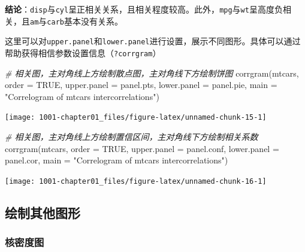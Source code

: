 \documentclass[
]{book}
\newenvironment{Shaded}{\begin{snugshade}}{\end{snugshade}}
\newcommand{\AttributeTok}[1]{\textcolor[rgb]{0.77,0.63,0.00}{#1}}
\newcommand{\CommentTok}[1]{\textcolor[rgb]{0.56,0.35,0.01}{\textit{#1}}}
\newcommand{\ConstantTok}[1]{\textcolor[rgb]{0.00,0.00,0.00}{#1}}
\newcommand{\FunctionTok}[1]{\textcolor[rgb]{0.00,0.00,0.00}{#1}}
\newcommand{\NormalTok}[1]{#1}
\newcommand{\StringTok}[1]{\textcolor[rgb]{0.31,0.60,0.02}{#1}}
\begin{document}
\textbf{结论}：\texttt{disp}与\texttt{cyl}呈正相关关系，且相关程度较高。此外，\texttt{mpg}与\texttt{wt}呈高度负相关，且\texttt{am}与\texttt{carb}基本没有关系。

这里可以对\texttt{upper.panel}和\texttt{lower.panel}进行设置，展示不同图形。具体可以通过帮助获得相信参数设置信息（\texttt{?corrgram}）

\begin{Shaded}
\begin{Highlighting}[]
\CommentTok{\# 相关图，主对角线上方绘制散点图，主对角线下方绘制饼图}
\FunctionTok{corrgram}\NormalTok{(mtcars, }\AttributeTok{order =} \ConstantTok{TRUE}\NormalTok{, }\AttributeTok{upper.panel =}\NormalTok{ panel.pts, }\AttributeTok{lower.panel =}\NormalTok{ panel.pie, }
    \AttributeTok{main =} \StringTok{"Correlogram of mtcars intercorrelations"}\NormalTok{)}
\end{Highlighting}
\end{Shaded}

\begin{center}\texttt{[image: 1001-chapter01\_files/figure-latex/unnamed-chunk-15-1]} \end{center}

\begin{Shaded}
\begin{Highlighting}[]
\CommentTok{\# 相关图，主对角线上方绘制置信区间，主对角线下方绘制相关系数}
\FunctionTok{corrgram}\NormalTok{(mtcars, }\AttributeTok{order =} \ConstantTok{TRUE}\NormalTok{, }\AttributeTok{upper.panel =}\NormalTok{ panel.conf, }\AttributeTok{lower.panel =}\NormalTok{ panel.cor, }
    \AttributeTok{main =} \StringTok{"Correlogram of mtcars intercorrelations"}\NormalTok{)}
\end{Highlighting}
\end{Shaded}

\begin{center}\texttt{[image: 1001-chapter01\_files/figure-latex/unnamed-chunk-16-1]} \end{center}

\hypertarget{ux7ed8ux5236ux5176ux4ed6ux56feux5f62}{%
\subsection{绘制其他图形}\label{ux7ed8ux5236ux5176ux4ed6ux56feux5f62}}

\hypertarget{ux6838ux5bc6ux5ea6ux56fe}{%
\subsubsection{核密度图}\label{ux6838ux5bc6ux5ea6ux56fe}}
\end{document}

